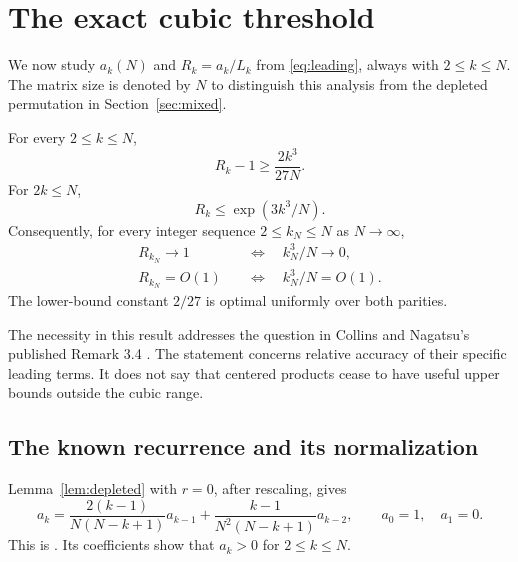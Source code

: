 \section{The exact cubic threshold}\label{sec:threshold}

We now study $a_k(N)$ and $R_k=a_k/L_k$ from \eqref{eq:leading}, always with $2\le k\le N$. The matrix size is denoted by $N$ to distinguish this analysis from the depleted permutation in Section~\ref{sec:mixed}.

\begin{theorem}\label{thm:threshold}
For every $2\le k\le N$,
\begin{equation}\label{eq:lower}
R_k-1\ge\frac{2k^3}{27N}.
\end{equation}
For $2k\le N$,
\begin{equation}\label{eq:upper}
R_k\le\exp(3k^3/N).
\end{equation}
Consequently, for every integer sequence $2\le k_N\le N$ as $N\to\infty$,
\begin{align}
R_{k_N}\to1&\quad\Longleftrightarrow\quad k_N^3/N\to0,\label{eq:iff}\\
R_{k_N}=O(1)&\quad\Longleftrightarrow\quad k_N^3/N=O(1).\label{eq:bounded}
\end{align}
The lower-bound constant $2/27$ is optimal uniformly over both parities.
\end{theorem}

The necessity in this result addresses the question in Collins and Nagatsu's published Remark 3.4 \cite{CN}. The statement concerns relative accuracy of their specific leading terms. It does not say that centered products cease to have useful upper bounds outside the cubic range.

\subsection{The known recurrence and its normalization}

Lemma~\ref{lem:depleted} with $r=0$, after rescaling, gives
\begin{equation}\label{eq:momentrec}
a_k=\frac{2(k-1)}{N(N-k+1)}a_{k-1}
+\frac{k-1}{N^2(N-k+1)}a_{k-2},
\qquad a_0=1,\quad a_1=0.
\end{equation}
This is \cite[equation (16)]{CN}. Its coefficients show that $a_k>0$ for $2\le k\le N$.

